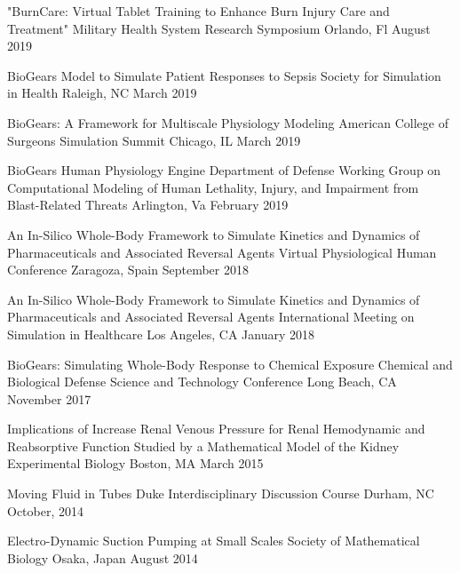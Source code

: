
\begin{cventries}

  \cventry
    {"BurnCare: Virtual Tablet Training to Enhance Burn Injury Care and Treatment"} %
    {Military Health System Research Symposium} %
    {Orlando, Fl} %
    {August 2019} %
     {
     }

  \cventry
    {BioGears Model to Simulate Patient Responses to Sepsis} %
    {Society for Simulation in Health} %
    {Raleigh, NC} %
    {March 2019} %
    {
    }

  \cventry
    {BioGears: A Framework for Multiscale Physiology Modeling} %
    {American College of Surgeons Simulation Summit} %
    {Chicago, IL} %
    {March 2019} %
    {
    }

  \cventry
    {BioGears Human Physiology Engine} %
    {Department of Defense Working Group on Computational Modeling of Human Lethality, Injury, and Impairment from Blast-Related Threats} %
    {Arlington, Va} %
    {February 2019} %
    {
    }

  \cventry
    {An In-Silico Whole-Body Framework to Simulate Kinetics and Dynamics of Pharmaceuticals and Associated Reversal Agents} %
    {Virtual Physiological Human Conference} %
    {Zaragoza, Spain} %
    {September 2018} %
    {
    }

  \cventry
    {An In-Silico Whole-Body Framework to Simulate Kinetics and Dynamics of Pharmaceuticals and Associated Reversal Agents} %
    {International Meeting on Simulation in Healthcare} %
    {Los Angeles, CA} %
    {January 2018} %
    {
    }

      \cventry
    {BioGears: Simulating Whole-Body Response to Chemical Exposure} %
    {Chemical and Biological Defense Science and Technology Conference} %
    {Long Beach, CA} %
    {November 2017} %
    {
    }

     \cventry
    {Implications of Increase Renal Venous Pressure for Renal Hemodynamic and Reabsorptive Function Studied by a Mathematical Model of the Kidney} %
    {Experimental Biology} %
    {Boston, MA} %
    {March 2015} %
    {
    }

    \cventry
    {Moving Fluid in Tubes} %
    {Duke Interdisciplinary Discussion Course} %
    {Durham, NC} %
    {October, 2014} %
    {
    }

    \cventry
    {Electro-Dynamic Suction Pumping at Small Scales} %
    {Society of Mathematical Biology} %
    {Osaka, Japan} %
    {August 2014} %
    {
    }



\end{cventries}
